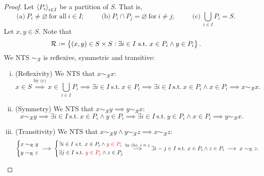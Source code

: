 \documentclass[11pt,openany]{article}
\begin{document}
\newpage
{}
\begin{proof}
	Let $\left\langle P_i \right\rangle_{i\in I}$ be a partition of $S$. That is, \[
	\text{(a)}\ P_i\neq\varnothing\ \text{for all}\ i\in I;\hspace{30pt}
	\text{(b)}\ P_i\cap P_j=\varnothing\ \text{for}\ i\neq j;\hspace{30pt}
	\text{(c)}\ \bigcup_{i\in I}P_i=S.
	\]
	Let $x,y\in S$. Note that \[
	\mathcal{R}:=\set{(x,y)\in S\times S: \exists i\in I\ \text{s.t.}\ x\in P_i\land y\in P_i}.
	\] We NTS $\sim_{\mathcal{R}}$ is reflexive, symmetric and transitive:
	\begin{enumerate}[(i)]
		\item (Reflexivity) We NTS that $x\sim_{\mathcal{R}} x$: \[
		x\in S\overset{\text{by (c)}}{\implies} x\in \bigcup_{i\in I}P_i\implies \exists i\in I\ \text{s.t.}\ x\in P_i\implies \exists i\in I\ \text{s.t.}\ x\in P_i\land x\in P_i\implies x\sim_{\mathcal{R}} x.
		\]
		\item (Symmetry) We NTS that $x\sim_{\mathcal{R}} y\implies y\sim_{\mathcal{R}} x$:\[
		x\sim_{\mathcal{R}} y\implies \exists i\in I\ \text{s.t.}\ x\in P_i\land y\in P_i\implies \exists i\in I\ \text{s.t.}\ y\in P_i\land x\in P_i\implies y\sim_{\mathcal{R}} x.
		\]
		\item (Transitivity) We NTS that $x\sim_{\mathcal{R}} y\land y\sim_{\mathcal{R}} z\implies x\sim_{\mathcal{R}} z$:\[
		\begin{cases*}
			x\sim_{\mathcal{R}} y \\
			y\sim_{\mathcal{R}} z
		\end{cases*}\implies \begin{cases*}
		\exists i\in I\ \text{s.t.}\ x\in P_i\land \textcolor{red}{y\in P_i} \\
		\exists j\in I\ \text{s.t.}\ \textcolor{red}{y\in P_j}\land z\in P_j
	\end{cases*}\overset{\text{by (b), $i=j$}}{\implies}\exists i=j\in I\ \text{s.t.}\ x\in P_i\land z\in P_i\implies x\sim_{\mathcal{R}} z.
		\]
	\end{enumerate}
\end{proof}
\end{document}
